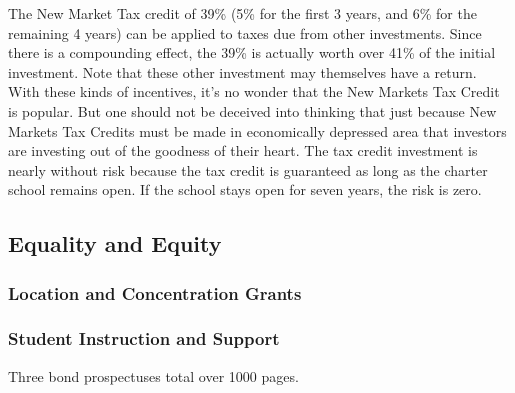 The New Market Tax credit of 39\% (5\% for the first 3 years, and 6\% for the remaining 4 years) can be applied to taxes due from other investments. Since there is a compounding effect, the 39\% is actually worth over 41\% of the initial investment. Note that these other investment may themselves have a return. With these kinds of incentives, it's no wonder that the New Markets Tax Credit is popular. But one should not be deceived into thinking that just because New Markets Tax Credits must be made in economically depressed area that investors are investing out of the goodness of their heart. The tax credit investment is nearly without risk because the tax credit is guaranteed as long as the charter school remains open. If the school stays open for seven years, the risk is zero.

\subsection{Equality and Equity}\indent%
\label{sec:equality_equity}

\subsubsection{Location and Concentration Grants}\indent%
\label{sec:tax-credit}

\subsubsection{Student Instruction and Support}\indent%
\label{student_instruction_support}

 Three bond prospectuses total over 1000 pages.    

